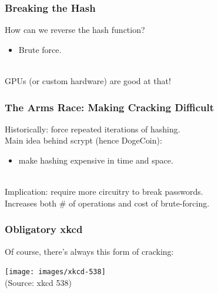 \begin{frame}
  \frametitle{Breaking the Hash}
  
    How can we reverse the hash function?
    \begin{itemize}
    \item    Brute force.
    \end{itemize}~\\
    GPUs (or custom hardware) are good at that!
  
\end{frame}

\begin{frame}
  \frametitle{The Arms Race: Making Cracking Difficult}
  
    Historically: force repeated iterations of hashing.\\[1em]

    Main idea behind scrypt (hence DogeCoin):
    \begin{itemize}
    \item make hashing expensive in time and space.
    \end{itemize}~\\
    Implication: require more circuitry to break passwords.\\
    Increases both \# of operations and cost of brute-forcing.
  
\end{frame}



\begin{frame}
\frametitle{Obligatory xkcd}

Of course, there's always this form of cracking:
\begin{center}
\texttt{[image: images/xkcd-538]}\\
\hfill (Source: xkcd 538)
\end{center}

\end{frame}


